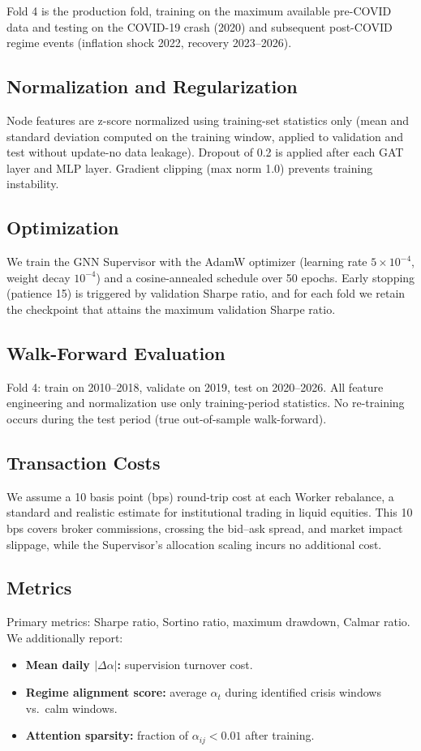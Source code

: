 \documentclass[conferences]{IEEEtran}
\begin{document}
Fold 4 is the production fold, training on the maximum available pre-COVID data and testing on the COVID-19 crash (2020) and subsequent post-COVID regime events (inflation shock 2022, recovery 2023--2026).

\subsection{Normalization and Regularization}
Node features are z-score normalized using training-set statistics only (mean and standard deviation computed on the training window, applied to validation and test without update-no data leakage). Dropout of 0.2 is applied after each GAT layer and MLP layer. Gradient clipping (max norm 1.0) prevents training instability.

\subsection{Optimization}
We train the GNN Supervisor with the AdamW optimizer (learning rate $5 \times 10^{-4}$, weight decay $10^{-4}$) and a cosine-annealed schedule over 50 epochs. Early stopping (patience 15) is triggered by validation Sharpe ratio, and for each fold we retain the checkpoint that attains the maximum validation Sharpe ratio.

\subsection{Walk-Forward Evaluation}
Fold 4: train on 2010--2018, validate on 2019, test on 2020--2026. All feature engineering and normalization use only training-period statistics. No re-training occurs during the test period (true out-of-sample walk-forward).

\subsection{Transaction Costs}
We assume a 10 basis point (bps) round-trip cost at each Worker rebalance, a standard and realistic estimate for institutional trading in liquid equities. This 10 bps covers broker commissions, crossing the bid--ask spread, and market impact slippage, while the Supervisor's allocation scaling incurs no additional cost.

\subsection{Metrics}
Primary metrics: Sharpe ratio, Sortino ratio, maximum drawdown, Calmar ratio. We additionally report:
\begin{itemize}
    \item \textbf{Mean daily $|\Delta\alpha|$:} supervision turnover cost.
    \item \textbf{Regime alignment score:} average $\alpha_t$ during identified crisis windows vs.\ calm windows.
    \item \textbf{Attention sparsity:} fraction of $\alpha_{ij} < 0.01$ after training.
\end{itemize}
\end{document}
